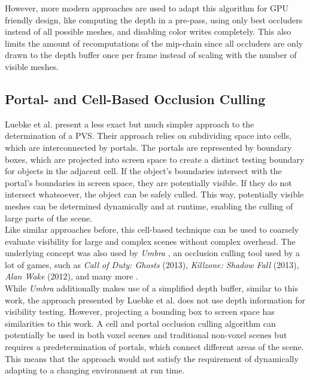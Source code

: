 \noindent
However, more modern approaches are used to adapt this algorithm for \ac{GPU} friendly design, like computing the depth 
in a pre-pass, using only best occluders instead of all possible meshes, and disabling color writes completely. This also 
limits the amount of recomputations of the mip-chain since all occluders are only drawn to the depth buffer once per 
frame instead of scaling with the number of visible meshes.


\subsection*{Portal- and Cell-Based Occlusion Culling}

Luebke et al. \cite{Luebke1995} present a less exact but much simpler approach to the determination
of a \ac{PVS}. Their approach relies on subdividing space into cells, which are interconnected by 
portals. The portals are represented by boundary boxes, which are projected into screen space to 
create a distinct testing boundary for objects in the adjacent cell. If the object's boundaries 
intersect with the portal's boundaries in screen space, they are potentially visible. If they do 
not intersect whatsoever, the object can be safely culled. This way, potentially visible meshes can 
be determined dynamically and at runtime, enabling the culling of large parts of the scene. \\

\noindent
Like similar approaches before, this cell-based technique can be used to coarsely evaluate visibility 
for large and complex scenes without complex overhead. The underlying concept was also used by 
\emph{Umbra} \cite{Umbra2024}, an occlusion culling tool used by a lot of games, such as 
\emph{Call of Duty: Ghosts} (2013), \emph{Killzone: Shadow Fall} (2013), \emph{Alan Wake} (2012), 
and many more \cite{UmbraWiki,CallOfDutyGhostsCredits,KillzoneUmbra,AlanWakeUmbra}. \\

\noindent
While \emph{Umbra} additionally makes use of a simplified depth buffer, similar to this work, the approach 
presented by Luebke et al. does not use depth information for visibility testing. However, projecting a 
bounding box to screen space has similarities to this work. A cell and portal occlusion culling algorithm 
can potentially be used in both voxel scenes and traditional non-voxel scenes but requires a 
predetermination of portals, which connect different areas of the scene. This means that the approach would 
not satisfy the requirement of dynamically adapting to a changing environment at run time. \\


